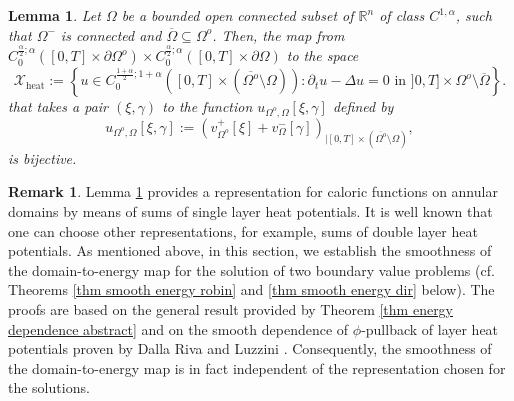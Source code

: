 \documentclass[11pt,reqno,a4paper]{amsart}
\theoremstyle{plain}
\newtheorem{lemma}[theorem]{Lemma}
\theoremstyle{definition}
\newtheorem{remark}[theorem]{Remark}
\begin{document}
\begin{lemma}\label{lemma rappr}
    Let $\Omega$ be a bounded open connected subset of $\mathbb{R}^n$ of class $C^{1,\alpha}$, such that $\Omega^-$ is connected and $\overline{\Omega}\subseteq\Omega^o$. Then, the map from $C_0^{\frac{\alpha}{2}; \alpha}([0,T] \times \partial\Omega^o) \times C_0^{\frac{\alpha}{2}; \alpha}([0,T] \times \partial \Omega)$ to the space 
    \begin{equation*}
    \mathcal{X}_{\mathrm{heat}} := \left\{u\in C_{0}^{\frac{1+\alpha}{2}; 1+\alpha}([0,T] \times (\overline{\Omega^o} \setminus \Omega)) \colon \partial_t u  - \Delta u =0 \text{ in } ]0,T] \times \Omega^o \setminus \overline{\Omega} \right\}.
    \end{equation*}
    that takes a pair $(\xi,\gamma)$ to the function $u_{\Omega^o,\Omega}[\xi,\gamma]$ defined by
    \begin{equation}\label{eq: representation single layer}
    u_{\Omega^o,\Omega}[\xi,\gamma] := \left(v^+_{\Omega^o} [\xi] + v^-_{\Omega}[\gamma] \right)_{| [0,T] \times (\overline{\Omega^o} \setminus \Omega)},
    \end{equation}
    is bijective.
\end{lemma}

\begin{remark}
    Lemma \ref{lemma rappr} provides a representation for caloric functions on annular domains by means of sums of single layer heat potentials. It is well known that one can choose other representations, for example, sums of double layer heat potentials. As mentioned above, in this section, we establish the smoothness of the domain-to-energy map for the solution of two boundary value problems (cf. Theorems \ref{thm smooth energy robin} and \ref{thm smooth energy dir} below). The proofs are based on the general result provided by Theorem \ref{thm energy dependence abstract} and on the smooth dependence of $\phi$-pullback of layer heat potentials proven by Dalla Riva and Luzzini \cite{DaLu23}. Consequently, the smoothness of the domain-to-energy map is in fact independent of the representation chosen for the solutions.
\end{remark}
\end{document}
